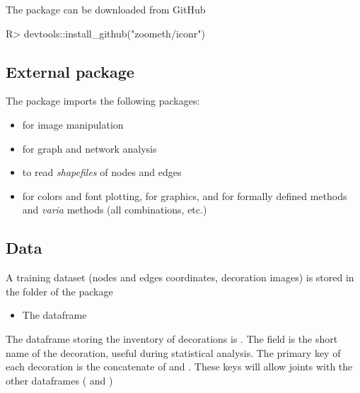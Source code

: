 \documentclass[article]{jss}\usepackage{knitr}
\begin{document}
The  package can be downloaded from GitHub
%
\begin{CodeChunk}
\begin{CodeInput}
R>   devtools::install_github("zoometh/iconr")
\end{CodeInput}
\end{CodeChunk}
%

\subsection{External package} \label{sec:ext_pck}

The  package imports the following packages:
\begin{itemize}
\setlength\itemsep{.1em}
  \item {} for image manipulation \citep{Ooms18}
  \item {} for graph and network analysis \citep{Csardi06} 
  \item {}  to read \emph{shapefiles} of nodes and edges \citep{Bivand19}
  \item {} for colors and font plotting,  for graphics,  and  for formally defined methods and \emph{varia} methods (all combinations, etc.) \citep{R19}
\end{itemize}

\subsection{Data} \label{sec:ext_data}

A training dataset (nodes and edges coordinates, decoration images) is stored in the  folder of the  package

\begin{itemize}
\item The  dataframe
\end{itemize}

The dataframe storing the inventory of decorations is . The field  is the short name of the decoration, useful during statistical analysis. The primary key of each decoration is the concatenate of  and . These keys will allow joints with the other dataframes ( and )\\
\end{document}
